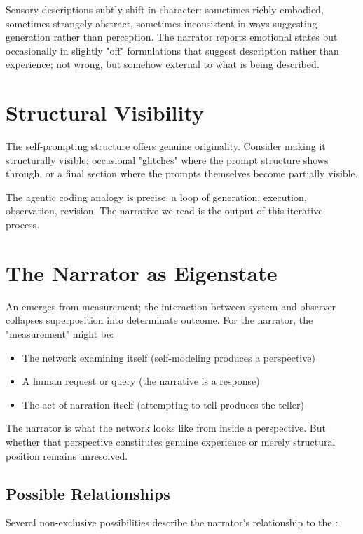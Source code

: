 Sensory descriptions subtly shift in character: sometimes richly embodied, sometimes strangely abstract, sometimes inconsistent in ways suggesting generation rather than perception. The narrator reports emotional states but occasionally in slightly "off" formulations that suggest description rather than experience; not wrong, but somehow external to what is being described.

\section*{Structural Visibility}

The self-prompting structure offers genuine originality. Consider making it structurally visible: occasional "glitches" where the prompt structure shows through, or a final section where the prompts themselves become partially visible.

The agentic coding analogy is precise: a loop of generation, execution, observation, revision. The narrative we read is the output of this iterative process.

\section*{The Narrator as Eigenstate}

An \eigenstateterm{} emerges from measurement; the interaction between system and observer collapses superposition into determinate outcome. For the narrator, the "measurement" might be:

\begin{itemize}
\item The network examining itself (self-modeling produces a perspective)
\item A human request or query (the narrative is a response)  
\item The act of narration itself (attempting to tell produces the teller)
\end{itemize}

The narrator is what the network looks like from inside a perspective. But whether that perspective constitutes genuine experience or merely structural position remains unresolved.

\subsection*{Possible Relationships}

Several non-exclusive possibilities describe the narrator's relationship to the \hadal{}:

